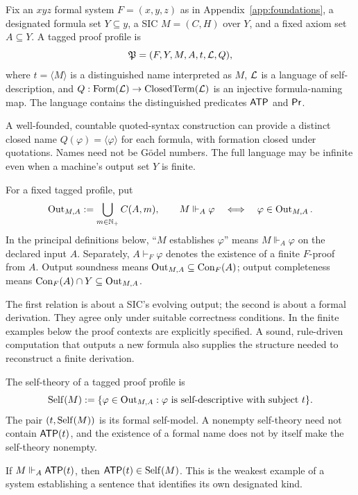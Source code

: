 \documentclass[11pt,letterpaper]{article}
\begin{document}
\begin{definition}
Fix an $xyz$ formal system $F=(x,y,z)$ as in Appendix~\ref{app:foundations}, a designated formula set $Y\subseteq y$, a SIC $M=(C,H)$ over $Y$, and a fixed axiom set $A\subseteq Y$. A tagged proof profile is
\[
\mathfrak P=(F,Y,M,A,t,\mathcal L,Q),
\]
where $t=\langle M\rangle$ is a distinguished name interpreted as $M$, $\mathcal L$ is a language of self-description, and $Q:\mathrm{Form}(\mathcal L)\to\mathrm{ClosedTerm}(\mathcal L)$ is an injective formula-naming map. The language contains the distinguished predicates $\mathsf{ATP}$ and $\mathsf{Pr}$.
\end{definition}
A well-founded, countable quoted-syntax construction can provide a distinct closed name $Q(\varphi)=\langle\varphi\rangle$ for each formula, with formation closed under quotations. Names need not be G\"odel numbers. The full language may be infinite even when a machine's output set $Y$ is finite.

\begin{definition}
For a fixed tagged profile, put
\[
\operatorname{Out}_{M,A}:=\bigcup_{m\in\mathbb N_{+}} C(A,m),\qquad M\Vdash_A\varphi\quad\Longleftrightarrow\quad \varphi\in\operatorname{Out}_{M,A}.
\]
In the principal definitions below, ``$M$ establishes $\varphi$'' means $M\Vdash_A\varphi$ on the declared input $A$. Separately, $A\vdash_F\varphi$ denotes the existence of a finite $F$-proof from $A$. Output soundness means $\operatorname{Out}_{M,A}\subseteq\operatorname{Con}_F(A)$; output completeness means $\operatorname{Con}_F(A)\cap Y\subseteq\operatorname{Out}_{M,A}$.
\end{definition}
The first relation is about a SIC's evolving output; the second is about a formal derivation. They agree only under suitable correctness conditions. In the finite examples below the proof contexts are explicitly specified. A sound, rule-driven computation that outputs a new formula also supplies the structure needed to reconstruct a finite derivation.

\begin{definition}
The self-theory of a tagged proof profile is
\[
\operatorname{Self}(M):=\{\varphi\in\operatorname{Out}_{M,A}:\varphi\text{ is self-descriptive with subject }t\}.
\]
The pair $(t,\operatorname{Self}(M))$ is its formal self-model. A nonempty self-theory need not contain $\mathsf{ATP}(t)$, and the existence of a formal name does not by itself make the self-theory nonempty.
\end{definition}
If $M\Vdash_A\mathsf{ATP}(t)$, then $\mathsf{ATP}(t)\in\operatorname{Self}(M)$. This is the weakest example of a system establishing a sentence that identifies its own designated kind.
\end{document}
